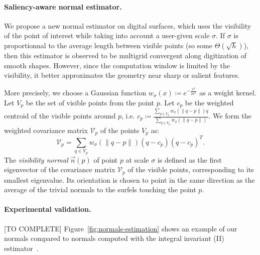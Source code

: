 \newcommand{\Kernel}[1]{\ensuremath{w_{\sigma}(#1)}}

\paragraph{Saliency-aware normal estimator.}
We propose a new normal estimator on digital surfaces, which uses
the visibility of the point of interest while taking into account
a user-given scale $\sigma$. If $\sigma$ is proportionnal to the
average length between visible points (so some
$\Theta\left(\sqrt{h}\right)$), then this estimator is observed to be
multigrid convergent along digitization of smooth shapes. However,
since the computation window is limited by the visibility, it
better approximates the geometry near sharp or salient features.

More precisely, we choose a Gaussian function
$\Kernel{x}\coloneqq e^{-\frac{x^2}{2\sigma^2}}$ as a weight kernel. Let
$V_p$ be the set of visible points from the point $p$. Let $c_p$
be the weighted centroid of the visible points around $p$,
i.e. $c_p \coloneqq \frac{\sum_{q \in V_p} \Kernel{\|q-p\|}q}{\sum_{q \in
V_p} \Kernel{\|q-p\|}}$. We form the weighted covariance matrix
$\mathcal{V}_p$ of the points $V_p$ as:
\begin{equation}
    \mathcal{V}_p = \sum_{q \in V_p} \Kernel{\|q-p\|}(q - c_p)(q - c_p)^T.
\end{equation}
The \emph{visibility normal} $\vec{n}(p)$ of point $p$ at scale $\sigma$ is defined
as the first eigenvector of the covariance matrix $\mathcal{V}_p$
of the visible points, corresponding to its smallest
eigenvalue. Its orientation is chosen to point in the same
direction as the average of the trivial normals to the surfels
touching the point $p$.


\paragraph{Experimental validation.} [TO COMPLETE]
Figure~\ref{fig:normals-estimation} shows an example
of our normals compared to normals computed with the integral invariant (II) estimator~\cite{Lachaud:2017-lnm}.

